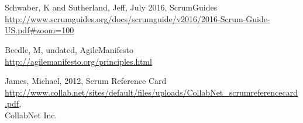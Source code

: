 \section * {}

\begin{thebibliography}{5}

         Schwaber, K and Sutherland, Jeff, July 2016, ScrumGuides \\ 
\url{http://www.scrumguides.org/docs/scrumguide/v2016/2016-Scrum-Guide-US.pdf#zoom=100}
    
         Beedle, M, undated, AgileManifesto  \\
\url{http://agilemanifesto.org/principles.html}


         James, Michael, 2012, Scrum Reference Card    \\ %
\url{http://www.collab.net/sites/default/files/uploads/CollabNet_scrumreferencecard.pdf},\\
        CollabNet Inc.


\end{thebibliography}